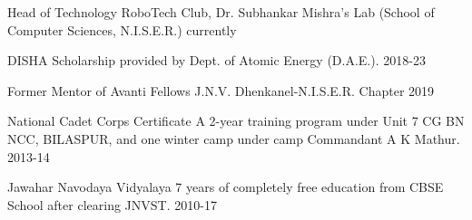 
\begin{cvhonors}

  \cvhonor
    {Head of Technology RoboTech Club, Dr. Subhankar Mishra's Lab} %
    {(School of Computer Sciences, N.I.S.E.R.)} %
    {} %
    {currently} %
    
             \cvhonor
    {DISHA Scholarship} %
    {provided by Dept. of Atomic Energy (D.A.E.).} %
    {} %
    {2018-23} 
    
  \cvhonor
    {Former Mentor of Avanti Fellows} %
    {J.N.V. Dhenkanel-N.I.S.E.R. Chapter} %
    {} %
    {2019}


 \cvhonor
    {National Cadet Corps Certificate A} %
    {2-year training program under Unit 7 CG BN NCC, BILASPUR, and one winter camp under camp Commandant A K Mathur. } %
    {} %
    {2013-14} 
    
    
     \cvhonor
    {Jawahar Navodaya Vidyalaya} %
    {7 years of completely free education from CBSE School after clearing JNVST. } %
    {} %
    {2010-17} 
    

\end{cvhonors}